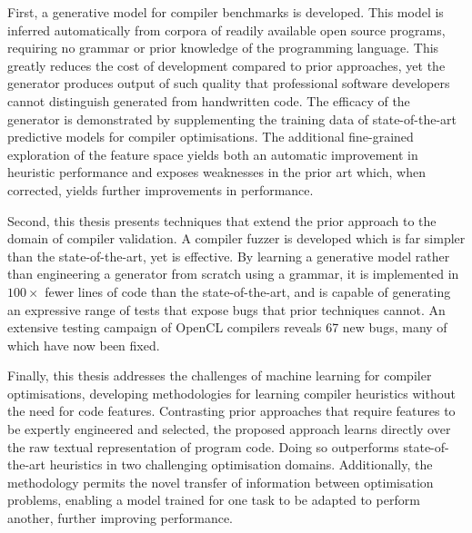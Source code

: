 First, a generative model for compiler benchmarks is developed. This model is inferred automatically from corpora of readily available open source programs, requiring no grammar or prior knowledge of the programming language. This greatly reduces the cost of development compared to prior approaches, yet the generator produces output of such quality that professional software developers cannot distinguish generated from handwritten code. The efficacy of the generator is demonstrated by supplementing the training data of state-of-the-art predictive models for compiler optimisations. The additional fine-grained exploration of the feature space yields both an automatic improvement in heuristic performance and exposes weaknesses in the prior art which, when corrected, yields further improvements in performance.

Second, this thesis presents techniques that extend the prior approach to the domain of compiler validation. A compiler fuzzer is developed which is far simpler than the state-of-the-art, yet is effective. By learning a generative model rather than engineering a generator from scratch using a grammar, it is implemented in $100\times$ fewer lines of code than the state-of-the-art, and is capable of generating an expressive range of tests that expose bugs that prior techniques cannot. An extensive testing campaign of OpenCL compilers reveals 67 new bugs, many of which have now been fixed.

Finally, this thesis addresses the challenges of machine learning for compiler optimisations, developing methodologies for learning compiler heuristics without the need for code features. Contrasting prior approaches that require features to be expertly engineered and selected, the proposed approach learns directly over the raw textual representation of program code. Doing so outperforms state-of-the-art heuristics in two challenging optimisation domains. Additionally, the methodology permits the novel transfer of information between optimisation problems, enabling a model trained for one task to be adapted to perform another, further improving performance.

